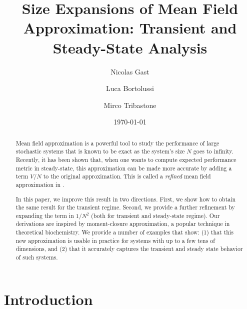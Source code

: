 \documentclass[sigconf]{acmart}
\begin{document}
\title{Size Expansions of Mean Field Approximation: Transient and
  Steady-State Analysis}%
\author{Nicolas Gast} %
%
\author{Luca Bortolussi}
\author{Mirco Tribastone}
\date{\today}


\begin{abstract}
  Mean field approximation is a powerful tool to study the performance
  of large stochastic systems that is known to be exact as the
  system's size $N$ goes to infinity. Recently, it has been shown
  that, when one wants to compute expected performance metric in
  steady-state, this approximation can be made more accurate by adding
  a term $V/N$ to the original approximation. This is called a
  \emph{refined} mean field approximation in \cite{gast2017refined}.
  
  In this paper, we improve this result in two directions. First, we
  show how to obtain the same result for the transient regime. Second,
  we provide a further refinement
  by expanding the term in $1/N^2$ (both for transient and
  steady-state regime). Our derivations are inspired by moment-closure
  approximation, a popular technique in theoretical biochemistry. We
  provide a number of examples that show: (1) that this new
  approximation is usable in practice for systems with up to a few
  tens of dimensions, and (2) that it accurately captures the
  transient and steady state behavior of such systems.
\end{abstract}

\maketitle 

\section{Introduction}
\end{document}
